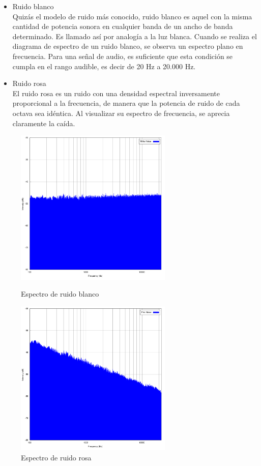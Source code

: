 \begin{itemize}
\item Ruido blanco\\
    Quizás el modelo de ruido más conocido, ruido blanco es aquel con la misma cantidad de potencia sonora en cualquier banda de un ancho de banda determinado. Es llamado así por analogía a la luz blanca. Cuando se realiza el diagrama de espectro de un ruido blanco, se observa un espectro plano en frecuencia. Para una señal de audio, es suficiente que esta condición se cumpla en el rango audible, es decir de 20 Hz a 20.000 Hz.

\item Ruido rosa\\
    El ruido rosa es un ruido con una densidad espectral inversamente proporcional a la frecuencia, de manera que la potencia de ruido de cada octava sea idéntica. Al visualizar su espectro de frecuencia, se aprecia claramente la caída.
\end{itemize}
 \begin{figure}[h] \centering
 \begin{minipage}{0.45\textwidth}\centering
   \includegraphics[width=7.5cm]{graphs/white_noise.png} \caption{Espectro de ruido blanco \cite{wikiwhitenoise}}\label{fig:diagrama:ruidoblanco}
 \end{minipage}\hfill
  \begin{minipage}{0.45\textwidth}\centering
    \includegraphics[width=7.5cm]{graphs/pink_noise.png} \caption{Espectro de ruido rosa \cite{wikipinknoise}}\label{fig:diagrama:ruidorosa}
  \end{minipage}
 \end{figure}

